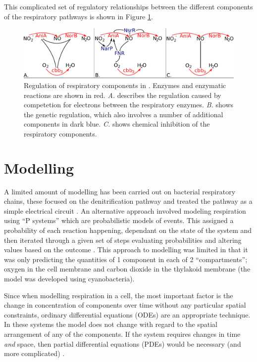 This complicated set of regulatory relationships between the different components of the respiratory pathways is shown in Figure \ref{fig:respiratory-pathway}.

\begin{figure}
 \begin{center}
 \includegraphics[width=14cm]{./01-introduction/data/regulation.pdf}
\end{center}
\caption{\footnotesize Regulation of respiratory components in \Nsm. Enzymes and enzymatic reactions are shown in red. \textit{A.} describes the regulation caused by competetion for electrons between the respiratory enzymes. \textit{B.} shows the genetic regulation, which also involves a number of additional components in dark blue. \textit{C.} shows chemical inhibition of the respiratory components.
\label{fig:respiratory-pathway}}
\end{figure}

\section{Modelling}

A limited amount of modelling has been carried out on bacterial respiratory chains, these focused on the denitrification pathway and treated the pathway as a simple electrical circuit \cite{almeida_unifying_1997}. An alternative approach involved modeling respiration using ``P systems'' which are probabilistic models of events. This assigned a probability of each reaction happening, dependant on the state of the system and then iterated through a given set of steps evaluating probabilities and altering values based on the outcome \cite{cavaliere_modeling_2006}. This approach to modelling was limited in that it was only predicting the quantities of 1 component in each of 2 ``compartments''; oxygen in the cell membrane and carbon dioxide in the thylakoid membrane (the model was developed using cyanobacteria).

Since when modelling respiration in a cell, the most important factor is the change in concentration of components over time without any particular spatial constraints, ordinary differential equations (ODEs) are an appropriate technique. In these systems the model does not change with regard to the spatial arrangement of any of the components. If the system requires changes in time \textit{and} space, then partial differential equations (PDEs) would be necessary (and more complicated) \cite{Klipp2005}.

